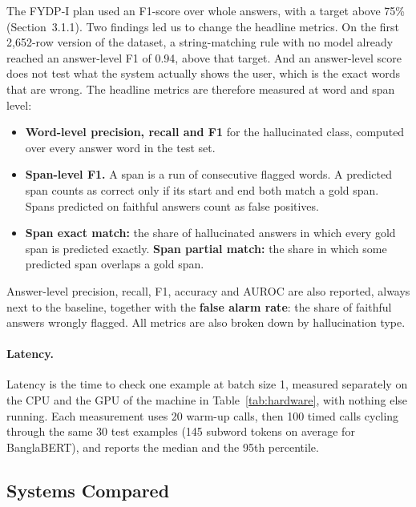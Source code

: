 The FYDP-I plan used an F1-score over whole answers, with a target above 75\%
(Section~3.1.1). Two findings led us to change the headline metrics. On the
first 2,652-row version of the dataset, a string-matching rule with no model
already reached an answer-level F1 of 0.94, above that target. And an
answer-level score does not test what the system actually shows the user, which
is the exact words that are wrong. The headline metrics are therefore measured
at word and span level:

\begin{itemize}
  \item \textbf{Word-level precision, recall and F1} for the hallucinated class,
  computed over every answer word in the test set.
  \item \textbf{Span-level F1.} A span is a run of consecutive flagged words. A
  predicted span counts as correct only if its start and end both match a gold
  span. Spans predicted on faithful answers count as false positives.
  \item \textbf{Span exact match:} the share of hallucinated answers in which
  every gold span is predicted exactly. \textbf{Span partial match:} the share
  in which some predicted span overlaps a gold span.
\end{itemize}

Answer-level precision, recall, F1, accuracy and AUROC are also reported,
always next to the baseline, together with the \textbf{false alarm rate}: the
share of faithful answers wrongly flagged. All metrics are also broken down by
hallucination type.

\paragraph{Latency.} Latency is the time to check one example at batch size 1,
measured separately on the CPU and the GPU of the machine in
Table~\ref{tab:hardware}, with nothing else running. Each measurement uses 20
warm-up calls, then 100 timed calls cycling through the same 30 test examples
(145 subword tokens on average for BanglaBERT), and reports the median and the
95th percentile.

\subsection{Systems Compared}
\label{sec:systems}


